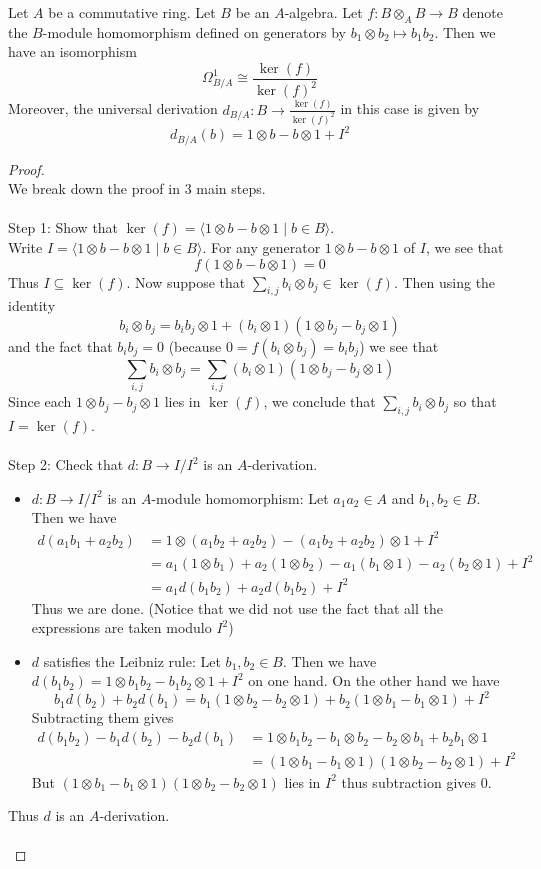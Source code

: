 \documentclass[a4paper]{article}
\begin{document}
\begin{prp}{}{} Let $A$ be a commutative ring. Let $B$ be an $A$-algebra. Let $f:B\otimes_AB\to B$ denote the $B$-module homomorphism defined on generators by $b_1\otimes b_2\mapsto b_1b_2$. Then we have an isomorphism $$\Omega_{B/A}^1\cong\frac{\ker(f)}{\ker(f)^2}$$ Moreover, the universal derivation $d_{B/A}:B\to\frac{\ker(f)}{\ker(f)^2}$ in this case is given by $$d_{B/A}(b)=1\otimes b-b\otimes 1+I^2$$
\begin{proof}\\
We break down the proof in 3 main steps. \\~\\
Step 1: Show that $\ker(f)=\langle 1\otimes b-b\otimes 1\;|\;b\in B\rangle$. \\
Write $I=\langle 1\otimes b-b\otimes 1\;|\;b\in B\rangle$. For any generator $1\otimes b-b\otimes 1$ of $I$, we see that $$f(1\otimes b-b\otimes 1)=0$$ Thus $I\subseteq\ker(f)$. Now suppose that $\sum_{i,j} b_i\otimes b_j\in\ker(f)$. Then using the identity $$b_i\otimes b_j=b_ib_j\otimes 1+(b_i\otimes 1)(1\otimes b_j-b_j\otimes 1)$$ and the fact that $b_ib_j=0$ (because $0=f(b_i\otimes b_j)=b_ib_j$) we see that $$\sum_{i,j} b_i\otimes b_j=\sum_{i,j}(b_i\otimes 1)(1\otimes b_j-b_j\otimes 1)$$ Since each $1\otimes b_j-b_j\otimes 1$ lies in $\ker(f)$, we conclude that $\sum_{i,j}b_i\otimes b_j$ so that $I=\ker(f)$. \\~\\
Step 2: Check that $d:B\to I/I^2$ is an $A$-derivation. \\
\begin{itemize}
\item $d:B\to I/I^2$ is an $A$-module homomorphism: Let $a_1a_2\in A$ and $b_1,b_2\in B$. Then we have 
\begin{align*}
d(a_1b_1+a_2b_2)&=1\otimes (a_1b_2+a_2b_2)-(a_1b_2+a_2b_2)\otimes 1+I^2\\
&=a_1(1\otimes b_1)+a_2(1\otimes b_2)-a_1(b_1\otimes 1)-a_2(b_2\otimes 1)+I^2\\
&=a_1d(b_1b_2)+a_2d(b_1b_2)+I^2
\end{align*}
Thus we are done. (Notice that we did not use the fact that all the expressions are taken modulo $I^2$)
\item $d$ satisfies the Leibniz rule: Let $b_1,b_2\in B$. Then we have $d(b_1b_2)=1\otimes b_1b_2-b_1b_2\otimes 1+I^2$ on one hand. On the other hand we have $$b_1d(b_2)+b_2d(b_1)=b_1(1\otimes b_2-b_2\otimes 1)+b_2(1\otimes b_1-b_1\otimes 1)+I^2$$ Subtracting them gives 
\begin{align*}
d(b_1b_2)-b_1d(b_2)-b_2d(b_1)&=1\otimes b_1b_2-b_1\otimes b_2-b_2\otimes b_1+b_2b_1\otimes 1\\
&=(1\otimes b_1-b_1\otimes 1)(1\otimes b_2-b_2\otimes 1)+I^2
\end{align*}
But $(1\otimes b_1-b_1\otimes 1)(1\otimes b_2-b_2\otimes 1)$ lies in $I^2$ thus subtraction gives $0$. 
\end{itemize}
Thus $d$ is an $A$-derivation. \\~\\


\end{proof}
\end{prp}
\end{document}
